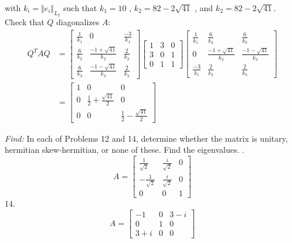 \documentclass[11pt]{homework}
\begin{document}
with $k_i = \Vert e_i \Vert_{L_2}$
such that 
$k_1 =  10$ ,
$k_2 =  82 - 2\sqrt{41}$ , and 
$k_2 =  82 - 2\sqrt{41}$.
Check that $Q$ diagonalizes $A$:
\begin{align*}
Q^T A Q &=
  \begin{bmatrix}
    \frac{1}{k_1}  & 0 & \frac{-3}{k_1} \\
    \frac{6}{k_2}  & \frac{-1+\sqrt{41}}{k_2} & \frac{2}{k_2}  \\
    \frac{6}{k_3} & \frac{-1-\sqrt{41}}{k_3} & \frac{2}{k_3}            
  \end{bmatrix}
  \begin{bmatrix}
  1 & 3 & 0 \\
  3 & 0 & 1 \\
  0 & 1 & 1
  \end{bmatrix}
  \begin{bmatrix}
    \frac{1}{k_1}  & \frac{6}{k_2}            & \frac{6}{k_3} \\
    0              & \frac{-1+\sqrt{41}}{k_2} & \frac{-1-\sqrt{41}}{k_3} \\
    \frac{-3}{k_1} & \frac{2}{k_2}            & \frac{2}{k_3}            
  \end{bmatrix} \\
  &=
  \begin{bmatrix}
  1 & 0 & 0 \\
  0 & \frac{1}{2}+\frac{\sqrt{41}}{2} & 0 \\
  0 & 0 & \frac{1}{2}-\frac{\sqrt{41}}{2}
  \end{bmatrix}
\end{align*}

\emph{Find:}
\newline
In each of Problems 12 and 14, 
determine whether the matrix is unitary, hermitian
skew-hermitian, or none of these.
Find the eigenvalues.
.
\begin{equation*}
  A = 
  \begin{bmatrix}
  \frac{1}{\sqrt{2}} & \frac{i}{\sqrt{2}} & 0 \\
  -\frac{1}{\sqrt{2}} & \frac{i}{\sqrt{2}} & 0 \\
  0 & 0 & 1
  \end{bmatrix}
\end{equation*}
14. 
\begin{equation*}
A = 
  \begin{bmatrix}
  -1 & 0 & 3-i \\
  0 & 1 & 0 \\
  3+i & 0 & 0
  \end{bmatrix}
\end{equation*}
\end{document}

